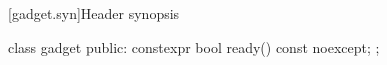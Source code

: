 [gadget.syn]{Header synopsis}

\begin{codeblock}
class gadget {
public:
  constexpr bool ready() const noexcept;
};
\end{codeblock}
